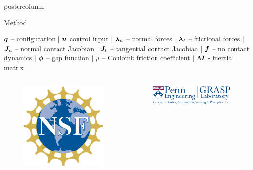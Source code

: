 \documentclass[final,hyperref={pdfpagelabels=false},5pt]{beamer}
\begin{document}
\begin{frame}
\begin{columns}
\begin{column}{.49\textwidth}
\begin{beamercolorbox}[center,wd=\textwidth]{postercolumn}
\begin{minipage}[T]{.95\textwidth}
{\begin{block}{Method}
              \begin{footnotesize}
                  \centering
              $\bm{q}$ -- configuration | $\bm{u}$ control input | $\NormalForce$ -- normal forces | $\FrictionForce$ -- frictional forces | $\Jn$ -- normal contact Jacobian | $\Jt$ -- tangential contact Jacobian | $\bm{f}$ -- no contact dynamics | $\bm{\phi}$ -- gap function | $\mu$ -- Coulomb friction coefficient | $\bm{M}$ - inertia matrix
              \end{footnotesize}
            \end{block}
            \footnotesize{\color{pennbl}
				
				}
           \begin{columns}[c]
				\begin{column}{.25\textwidth}
				
				\begin{figure}
				
					\includegraphics[width=\textwidth]{NSFLogo}
				\end{figure}
				\end{column}
				\begin{column}{.64\textwidth}
				\centering
				\begin{figure}
				\centering
					\includegraphics[width=\textwidth]{grasp_logo1_blue}
				\end{figure}


\end{column}
\end{columns}}
\end{minipage}
\end{beamercolorbox}
\end{column}
\end{columns}
\end{frame}
\end{document}
